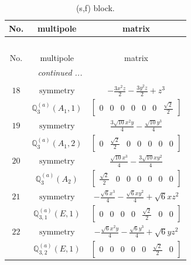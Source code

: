 \documentclass[fleqn,8pt,landscape]{jsarticle}
\begin{document}
\begin{longtable}{ccc}
\caption{(s,f) block.}
 \\
 \hline \hline
No. & multipole & matrix \\ \hline \endfirsthead

\multicolumn{2}{l}{\tablename\ \thetable{}} \\
 \hline \hline
No. & multipole & matrix \\ \hline \endhead

 \hline \hline
\multicolumn{2}{r}{\footnotesize\it continued ...} \\ \endfoot

 \hline \hline
\multicolumn{2}{r}{} \\ \endlastfoot

$ 18 $ & $ \text{symmetry} $ & $ - \frac{3 x^{2} z}{2} - \frac{3 y^{2} z}{2} + z^{3} $ \\
$  $ & $ \mathbb{Q}_{3}^{(a)}(A_{1},1) $ & $ \begin{bmatrix} 0 & 0 & 0 & 0 & 0 & 0 & \frac{\sqrt{2}}{2} \end{bmatrix} $ \\ \hline
$ 19 $ & $ \text{symmetry} $ & $ \frac{3 \sqrt{10} x^{2} y}{4} - \frac{\sqrt{10} y^{3}}{4} $ \\
$  $ & $ \mathbb{Q}_{3}^{(a)}(A_{1},2) $ & $ \begin{bmatrix} 0 & \frac{\sqrt{2}}{2} & 0 & 0 & 0 & 0 & 0 \end{bmatrix} $ \\ \hline
$ 20 $ & $ \text{symmetry} $ & $ \frac{\sqrt{10} x^{3}}{4} - \frac{3 \sqrt{10} x y^{2}}{4} $ \\
$  $ & $ \mathbb{Q}_{3}^{(a)}(A_{2}) $ & $ \begin{bmatrix} \frac{\sqrt{2}}{2} & 0 & 0 & 0 & 0 & 0 & 0 \end{bmatrix} $ \\ \hline
$ 21 $ & $ \text{symmetry} $ & $ - \frac{\sqrt{6} x^{3}}{4} - \frac{\sqrt{6} x y^{2}}{4} + \sqrt{6} x z^{2} $ \\
$  $ & $ \mathbb{Q}_{3,1}^{(a)}(E,1) $ & $ \begin{bmatrix} 0 & 0 & 0 & 0 & \frac{\sqrt{2}}{2} & 0 & 0 \end{bmatrix} $ \\ \hline
$ 22 $ & $ \text{symmetry} $ & $ - \frac{\sqrt{6} x^{2} y}{4} - \frac{\sqrt{6} y^{3}}{4} + \sqrt{6} y z^{2} $ \\
$  $ & $ \mathbb{Q}_{3,2}^{(a)}(E,1) $ & $ \begin{bmatrix} 0 & 0 & 0 & 0 & 0 & \frac{\sqrt{2}}{2} & 0 \end{bmatrix} $ \\ \hline

\end{longtable}
\end{document}
